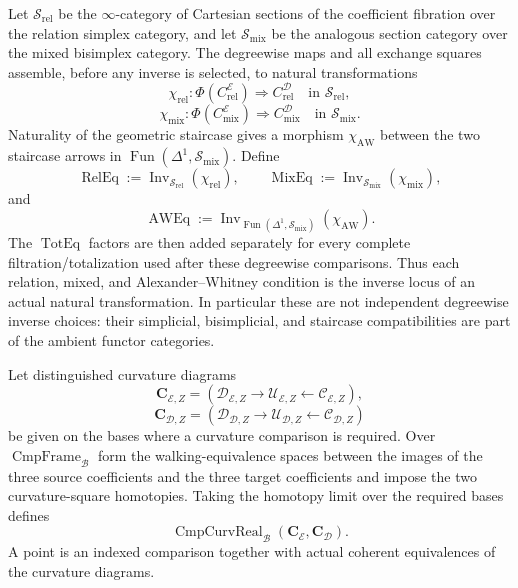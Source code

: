 \begin{construction}
Let $\mathcal S_{\mathrm{rel}}$ be the $\infty$-category of Cartesian sections
of the coefficient fibration over the relation simplex category, and let
$\mathcal S_{\mathrm{mix}}$ be the analogous section category over the mixed
bisimplex category.  The degreewise maps and all exchange squares assemble,
before any inverse is selected, to natural transformations
\[
\chi_{\mathrm{rel}}:
\Phi(C_{\mathrm{rel}}^{\mathcal E})
\Longrightarrow C_{\mathrm{rel}}^{\mathcal D}
\quad\text{in }\mathcal S_{\mathrm{rel}},
\]
\[
\chi_{\mathrm{mix}}:
\Phi(C_{\mathrm{mix}}^{\mathcal E})
\Longrightarrow C_{\mathrm{mix}}^{\mathcal D}
\quad\text{in }\mathcal S_{\mathrm{mix}}.
\]
Naturality of the geometric staircase gives a morphism
$\chi_{\mathrm{AW}}$ between the two staircase arrows in
$\operatorname{Fun}(\Delta^1,\mathcal S_{\mathrm{mix}})$.  Define
\[
\boxed{
\operatorname{RelEq}:=
\operatorname{Inv}_{\mathcal S_{\mathrm{rel}}}(\chi_{\mathrm{rel}}),
\qquad
\operatorname{MixEq}:=
\operatorname{Inv}_{\mathcal S_{\mathrm{mix}}}(\chi_{\mathrm{mix}}),
}
\]
and
\[
\boxed{
\operatorname{AWEq}:=
\operatorname{Inv}_{\operatorname{Fun}(\Delta^1,\mathcal S_{\mathrm{mix}})}
(\chi_{\mathrm{AW}}).
}
\]
The $\operatorname{TotEq}$ factors are then added separately for every complete
filtration/totalization used after these degreewise comparisons.  Thus each
relation, mixed, and Alexander--Whitney condition is the inverse locus of an
actual natural transformation.  In particular these are not independent
degreewise inverse choices: their simplicial, bisimplicial, and staircase
compatibilities are part of the ambient functor categories.
\end{construction}

\begin{definition}
\label{def:prequantum-morphism-curvature-diagrams}
Let distinguished curvature diagrams
\[
\mathbf C_{\mathcal E,Z}
=(\mathscr D_{\mathcal E,Z}\to\mathscr U_{\mathcal E,Z}
  \leftarrow\mathscr C_{\mathcal E,Z}),
\]
\[
\mathbf C_{\mathcal D,Z}
=(\mathscr D_{\mathcal D,Z}\to\mathscr U_{\mathcal D,Z}
  \leftarrow\mathscr C_{\mathcal D,Z})
\]
be given on the bases where a curvature comparison is required.  Over
$\operatorname{CmpFrame}_{\mathcal B}$ form the walking-equivalence spaces
between the images of the three source coefficients and the three target
coefficients and impose the two curvature-square homotopies.  Taking the
homotopy limit over the required bases defines
\[
\boxed{
\operatorname{CmpCurvReal}_{\mathcal B}
(\mathbf C_{\mathcal E},\mathbf C_{\mathcal D}).
}
\]
A point is an indexed comparison together with actual coherent equivalences of
the curvature diagrams.
\end{definition}

